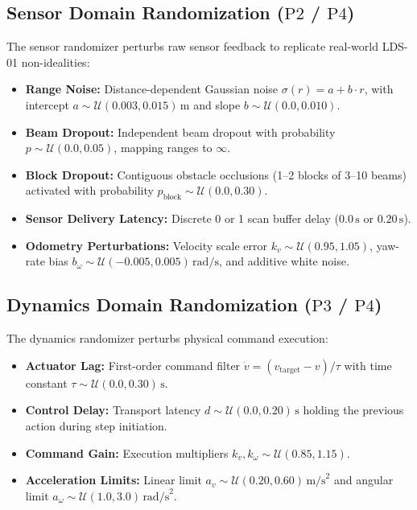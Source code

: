 \documentclass[conference]{IEEEtran}
\begin{document}
\subsection{Sensor Domain Randomization ($\text{P2}$ / $\text{P4}$)}
The sensor randomizer perturbs raw sensor feedback to replicate real-world LDS-01 non-idealities:
\begin{itemize}
    \item \textbf{Range Noise:} Distance-dependent Gaussian noise $\sigma(r) = a + b \cdot r$, with intercept $a \sim \mathcal{U}(0.003, 0.015)\,\text{m}$ and slope $b \sim \mathcal{U}(0.0, 0.010)$.
    \item \textbf{Beam Dropout:} Independent beam dropout with probability $p \sim \mathcal{U}(0.0, 0.05)$, mapping ranges to $\infty$.
    \item \textbf{Block Dropout:} Contiguous obstacle occlusions (1--2 blocks of 3--10 beams) activated with probability $p_{\text{block}} \sim \mathcal{U}(0.0, 0.30)$.
    \item \textbf{Sensor Delivery Latency:} Discrete 0 or 1 scan buffer delay ($0.0\,\text{s}$ or $0.20\,\text{s}$).
    \item \textbf{Odometry Perturbations:} Velocity scale error $k_v \sim \mathcal{U}(0.95, 1.05)$, yaw-rate bias $b_\omega \sim \mathcal{U}(-0.005, 0.005)\,\text{rad/s}$, and additive white noise.
\end{itemize}

\subsection{Dynamics Domain Randomization ($\text{P3}$ / $\text{P4}$)}
The dynamics randomizer perturbs physical command execution:
\begin{itemize}
    \item \textbf{Actuator Lag:} First-order command filter $\dot{v} = (v_{\text{target}} - v) / \tau$ with time constant $\tau \sim \mathcal{U}(0.0, 0.30)\,\text{s}$.
    \item \textbf{Control Delay:} Transport latency $d \sim \mathcal{U}(0.0, 0.20)\,\text{s}$ holding the previous action during step initiation.
    \item \textbf{Command Gain:} Execution multipliers $k_v, k_\omega \sim \mathcal{U}(0.85, 1.15)$.
    \item \textbf{Acceleration Limits:} Linear limit $a_v \sim \mathcal{U}(0.20, 0.60)\,\text{m/s}^2$ and angular limit $a_\omega \sim \mathcal{U}(1.0, 3.0)\,\text{rad/s}^2$.
\end{itemize}
\end{document}
